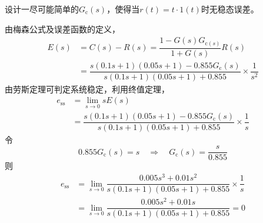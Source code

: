 \noindent 设计一尽可能简单的$G_\text{c}(s)$，使得当$r(t)=t·1(t)$时无稳态误差。

\solve 由梅森公式及误差函数的定义，
\begin{align*}
	E(s) &= C(s) - R(s) = \dfrac{1-G(s)G_{\text{c}(s)}}{1+G(s)} R(s)\\[0.5em]
	& = \dfrac{s(0.1s+1)(0.05s+1) - 0.855G_{\text{c}}(s)}{s(0.1s+1)(0.05s+1)+0.855} \times \dfrac{1}{s^2}
\end{align*}
由劳斯定理可判定系统稳定，利用终值定理，
\begin{align*}
	e_{\text{ss}} &= \lim\limits_{s\to 0} sE(s)\\[0.5em]
	& = \dfrac{s(0.1s+1)(0.05s+1) - 0.855G_{\text{c}}(s)}{s(0.1s+1)(0.05s+1)+0.855} \times \dfrac{1}{s}
\end{align*}
令
\begin{equation*}
	0.855G_{\text{c}}(s) = s \quad \Rightarrow \quad G_{\text{c}}(s) = \dfrac{s}{0.855}
\end{equation*}
则
\begin{align*}
	e_{\text{ss}} & = \lim\limits_{s \to 0} \dfrac{0.005s^3+0.01s^2}{s(0.1s+1)(0.05s+1)+0.855} \times \dfrac{1}{s} \\[0.5em]
	& = \lim\limits_{s \to 0} \dfrac{0.005s^2+0.01s}{s(0.1s+1)(0.05s+1)+0.855} = 0
\end{align*}
\vspace*{-3em}


